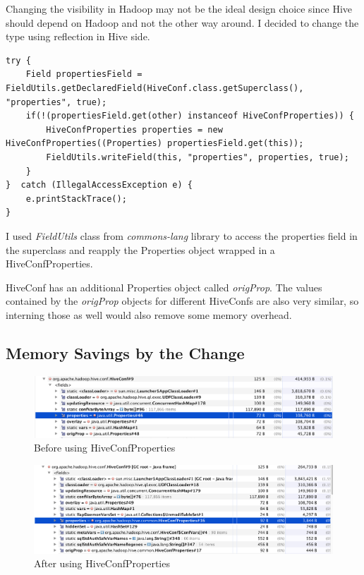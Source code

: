Changing the visibility in Hadoop may not be the ideal design choice since Hive should depend on Hadoop and not the other way around. I decided to change the type using reflection in Hive side. 

\begin{lstlisting}
try {
	Field propertiesField = FieldUtils.getDeclaredField(HiveConf.class.getSuperclass(), "properties", true);
	if(!(propertiesField.get(other) instanceof HiveConfProperties)) {
		HiveConfProperties properties = new HiveConfProperties((Properties) propertiesField.get(this));
		FieldUtils.writeField(this, "properties", properties, true);
	}
}  catch (IllegalAccessException e) {
	e.printStackTrace();
}
\end{lstlisting}

I used \textit{FieldUtils} class from \textit{commons-lang} library to access the properties field in the superclass and reapply the Properties object wrapped in a HiveConfProperties.

HiveConf has an additional Properties object called \textit{origProp}. The values contained by the \textit{origProp} objects for different HiveConfs are also very similar, so interning those as well would also remove some memory overhead. 

\subsection{Memory Savings by the Change}
\begin{figure}[H]
	\includegraphics[width=150mm, keepaspectratio]{figures/hiveconf_orig.png}
	\centering
	\caption{Before using HiveConfProperties}
\end{figure}

\begin{figure}[H]
	\includegraphics[width=150mm, keepaspectratio]{figures/hiveconf_interned.png}
	\centering
	\caption{After using HiveConfProperties}
\end{figure}

